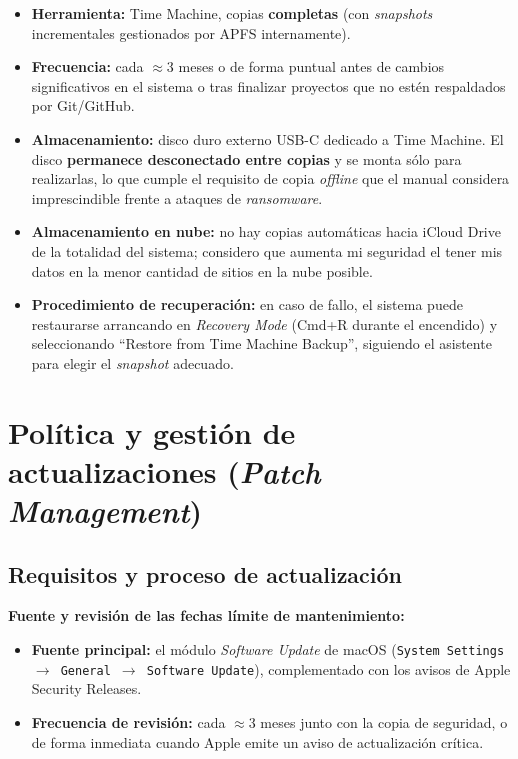 \begin{itemize}[leftmargin=*]
    \item \textbf{Herramienta:} Time Machine, copias \textbf{completas} (con \textit{snapshots} incrementales gestionados por APFS internamente).
    \item \textbf{Frecuencia:} cada $\approx$3 meses o de forma puntual antes de cambios significativos en el sistema o tras finalizar proyectos que no estén respaldados por Git/GitHub.
    \item \textbf{Almacenamiento:} disco duro externo USB-C dedicado a Time Machine. El disco \textbf{permanece desconectado entre copias} y se monta sólo para realizarlas, lo que cumple el requisito de copia \textit{offline} que el manual considera imprescindible frente a ataques de \textit{ransomware}.
    \item \textbf{Almacenamiento en nube:} no hay copias automáticas hacia iCloud Drive de la totalidad del sistema; considero que aumenta mi seguridad el tener mis datos en la menor cantidad de sitios en la nube posible.
    \item \textbf{Procedimiento de recuperación:} en caso de fallo, el sistema puede restaurarse arrancando en \textit{Recovery Mode} (Cmd+R durante el encendido) y seleccionando ``Restore from Time Machine Backup'', siguiendo el asistente para elegir el \textit{snapshot} adecuado.
\end{itemize}

\section{Política y gestión de actualizaciones (\textit{Patch Management})}
\label{sec:actualizaciones}

\subsection{Requisitos y proceso de actualización}
\label{subsec:actualizacion_proceso}

\textbf{Fuente y revisión de las fechas límite de mantenimiento:}
\begin{itemize}[leftmargin=*]
    \item \textbf{Fuente principal:} el módulo \textit{Software Update} de macOS (\texttt{System Settings $\to$ General $\to$ Software Update}), complementado con los avisos de Apple Security Releases.
    \item \textbf{Frecuencia de revisión:} cada $\approx$3 meses junto con la copia de seguridad, o de forma inmediata cuando Apple emite un aviso de actualización crítica.
\end{itemize}


